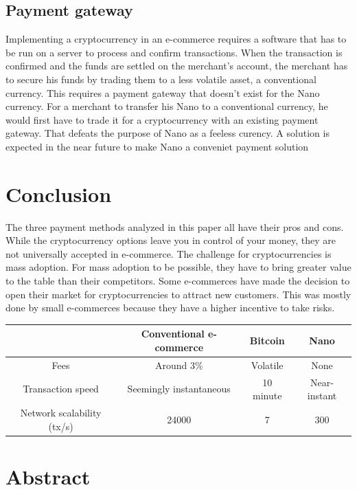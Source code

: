 \documentclass{ferseminar}
\begin{document}
\subsection{Payment gateway}
Implementing a cryptocurrency in an e-commerce requires a software that has to be run on a server to process and confirm transactions. When the transaction is confirmed and the funds are settled on the merchant's account, the merchant has to secure his funds by trading them to a less volatile asset, a conventional currency. This requires a payment gateway that doesn't exist for the Nano currency. For a merchant to transfer his Nano to a conventional currency, he would first have to trade it for a cryptocurrency with an existing payment gateway. That defeats the purpose of Nano as a feeless curency. A solution is expected in the near future to make Nano a conveniet payment solution 

\section{Conclusion}
The three payment methods analyzed in this paper all have their pros and cons. While the cryptocurrency options leave you in control of your money, they are not universally accepted in e-commerce. The challenge for cryptocurrencies is mass adoption. For mass adoption to be possible, they have to bring greater value to the table than their competitors. Some e-commerces have made the decision to open their market for cryptocurrencies to attract new customers. This was mostly done by small e-commerces because they have a higher incentive to take risks. 


\begin{center}
	\begin{tabular}{ |c||c|c|c| }
		\hline
		& Conventional e-commerce & Bitcoin & Nano\\ 
		\hline\hline
		Fees & Around 3\% & Volatile & None\\  
		\hline
		Transaction speed & Seemingly instantaneous & 10 minute & Near-instant\\
		\hline
		Network scalability (tx/s) & 24000 & 7 & 300\\
		\hline
	\end{tabular}
\end{center}
\section{Abstract}
\end{document}
